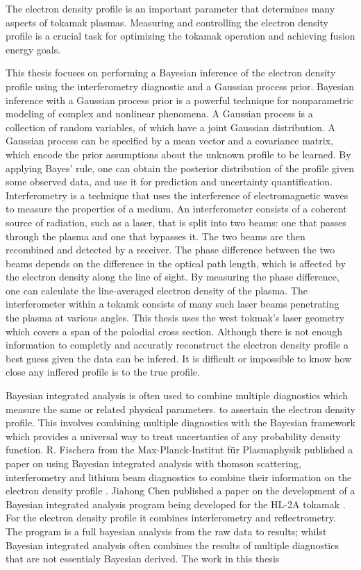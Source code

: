 The electron density profile is an important parameter that determines many aspects of tokamak plasmas. Measuring and controlling the electron density profile is a crucial task for optimizing the tokamak operation and achieving fusion energy goals.

This thesis focuses on performing a Bayesian inference of the electron density profile using the interferometry diagnostic and a Gaussian process prior. Bayesian inference with a Gaussian process prior is a powerful technique for nonparametric modeling of complex and nonlinear phenomena. A Gaussian process is a collection of random variables, of which have a joint Gaussian distribution. A Gaussian process can be specified by a mean vector and a covariance matrix, which encode the prior assumptions about the unknown profile to be learned. By applying Bayes’ rule, one can obtain the posterior distribution of the profile given some observed data, and use it for prediction and uncertainty quantification. Interferometry is a technique that uses the interference of electromagnetic waves to measure the properties of a medium. An interferometer consists of a coherent source of radiation, such as a laser, that is split into two beams: one that passes through the plasma and one that bypasses it. The two beams are then recombined and detected by a receiver. The phase difference between the two beams depends on the difference in the optical path length, which is affected by the electron density along the line of sight. By measuring the phase difference, one can calculate the line-averaged electron density of the plasma. The interferometer within a tokamk consists of many such laser beams penetrating the plasma at various angles. This thesis uses the \gls{west} tokmak's laser geometry which covers a span of the polodial cross section. Although there is not enough information to completly and accuratly reconstruct the electron density profile a best guess given the data can be infered. It is difficult or impossible to know how close any inffered profile is to the true profile.

Bayesian integrated analysis is often used to combine multiple diagnostics which measure the same or related physical parameters. to assertain the electron density profile. This involves combining multiple diagnostics with the Bayesian framework which provides a universal way to treat uncertanties of any probability density function. R. Fischera from the Max-Planck-Institut für Plasmaphysik published a paper on using Bayesian integrated analysis with thomson scattering, interferometry and lithium beam diagnostics to combine their information on the electron density profile \cite{IDAmaxPlanck}. Jiahong Chen published a paper on the development of a Bayesian integrated analysis program being developed for the HL-2A tokamak \cite{IDAgeert2023}. For the electron density profile it combines interferometry and reflectrometry. The program is a full bayesian analysis from the raw data to results; whilst Bayesian integrated analysis often combines the results of multiple diagnostics that are not essentialy Bayesian derived. The work in this thesis 

